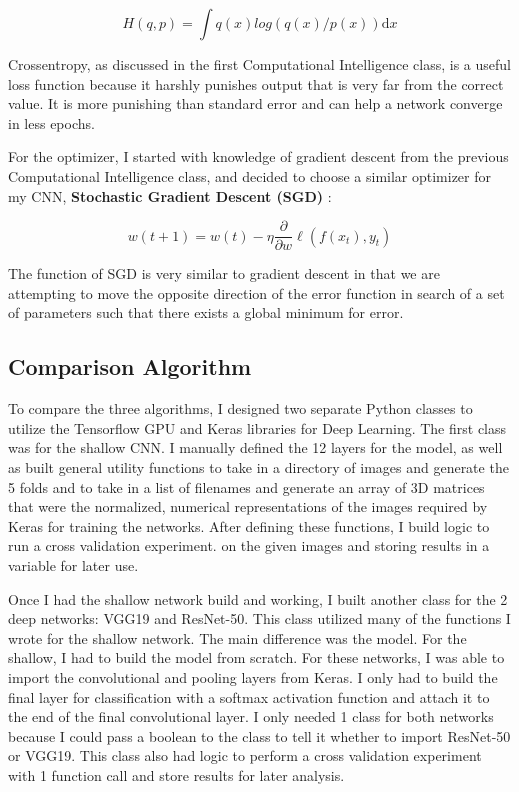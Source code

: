 \documentclass[12pt]{article}
\begin{document}
\[
		H(q,p) =  \int q(x) log(q(x) / p(x)) \mathrm{d}x
\]

Crossentropy, as discussed in the first Computational Intelligence class, is a useful loss function because it harshly punishes output that is very far from the correct value. It is more punishing than standard error and can help a network converge in less epochs. 

For the optimizer, I started with knowledge of gradient descent from the previous Computational Intelligence class, and decided to choose a similar optimizer for my CNN, \textbf{Stochastic Gradient Descent (SGD)} \cite{sgd}:

\[
	w(t+1) = w(t) - \eta \frac{\partial}{\partial w} \ell(f(x_t), y_t)
\]

The function of SGD is very similar to gradient descent in that we are attempting to move the opposite direction of the error function in search of a set of parameters such that there exists a global minimum for error.

	\subsection{Comparison Algorithm}
	
To compare the three algorithms, I designed two separate Python classes to utilize the Tensorflow GPU and Keras libraries for Deep Learning. The first class was for the shallow CNN. I manually defined the 12 layers for the model, as well as built general utility functions to take in a directory of images and generate the 5 folds and to take in a list of filenames and generate an array of 3D matrices that were the normalized, numerical representations of the images required by Keras for training the networks. After defining these functions, I build logic to run a cross validation experiment. on the given images and storing results in a variable for later use.

Once I had the shallow network build and working, I built another class for the 2 deep networks: VGG19 and ResNet-50. This class utilized many of the functions I wrote for the shallow network. The main difference was the model. For the shallow, I had to build the model from scratch. For these networks, I was able to import the convolutional and pooling layers from Keras. I only had to build the final layer for classification with a softmax activation function and attach it to the end of the final convolutional layer. I only needed 1 class for both networks because I could pass a boolean to the class to tell it whether to import ResNet-50 or VGG19. This class also had logic to perform a cross validation experiment with 1 function call and store results for later analysis. 
\end{document}
